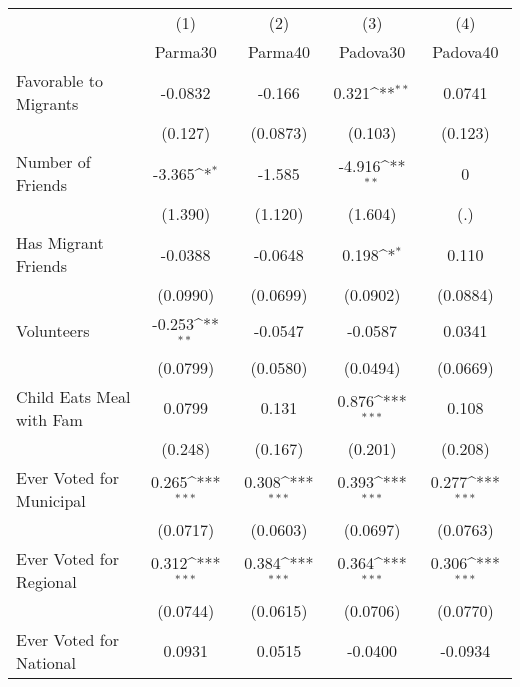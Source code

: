 {
\def\sym#1{\ifmmode^{#1}\else\(^{#1}\)\fi}
\begin{tabular}{l*{4}{c}}
\hline\hline
            &\multicolumn{1}{c}{(1)}&\multicolumn{1}{c}{(2)}&\multicolumn{1}{c}{(3)}&\multicolumn{1}{c}{(4)}\\
            &\multicolumn{1}{c}{Parma30}&\multicolumn{1}{c}{Parma40}&\multicolumn{1}{c}{Padova30}&\multicolumn{1}{c}{Padova40}\\
\hline
Favorable to Migrants&     -0.0832         &      -0.166         &       0.321\sym{**} &      0.0741         \\
            &     (0.127)         &    (0.0873)         &     (0.103)         &     (0.123)         \\
[1em]
Number of Friends&      -3.365\sym{*}  &      -1.585         &      -4.916\sym{**} &           0         \\
            &     (1.390)         &     (1.120)         &     (1.604)         &         (.)         \\
[1em]
Has Migrant Friends&     -0.0388         &     -0.0648         &       0.198\sym{*}  &       0.110         \\
            &    (0.0990)         &    (0.0699)         &    (0.0902)         &    (0.0884)         \\
[1em]
Volunteers  &      -0.253\sym{**} &     -0.0547         &     -0.0587         &      0.0341         \\
            &    (0.0799)         &    (0.0580)         &    (0.0494)         &    (0.0669)         \\
[1em]
Child Eats Meal with Fam&      0.0799         &       0.131         &       0.876\sym{***}&       0.108         \\
            &     (0.248)         &     (0.167)         &     (0.201)         &     (0.208)         \\
[1em]
Ever Voted for Municipal&       0.265\sym{***}&       0.308\sym{***}&       0.393\sym{***}&       0.277\sym{***}\\
            &    (0.0717)         &    (0.0603)         &    (0.0697)         &    (0.0763)         \\
[1em]
Ever Voted for Regional&       0.312\sym{***}&       0.384\sym{***}&       0.364\sym{***}&       0.306\sym{***}\\
            &    (0.0744)         &    (0.0615)         &    (0.0706)         &    (0.0770)         \\
[1em]
Ever Voted for National&      0.0931         &      0.0515         &     -0.0400         &     -0.0934         \\

\end{tabular}}
